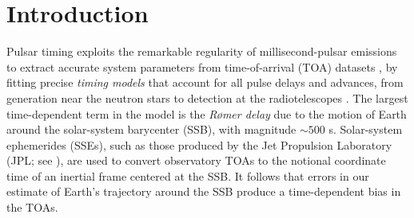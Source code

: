 \documentclass{aastex63}
\begin{document}


\section{Introduction}
\label{sec:intro}

Pulsar timing exploits the remarkable regularity of millisecond-pulsar emissions to extract accurate system parameters from time-of-arrival (TOA) datasets \citep{2012hpa..book.....L},
by fitting precise \emph{timing models} that account for all pulse delays and advances, from generation near the neutron stars to detection at the radiotelescopes \citep{2013CQGra..30v4001L}.
The largest time-dependent term in the model is the \emph{R{\o}mer delay} \citep{Roemer1676} due to the motion of Earth around the solar-system barycenter (SSB), with magnitude $\sim 500$ s. Solar-system ephemerides (SSEs), such as those produced by the Jet Propulsion Laboratory (JPL; see \citealt{2009IPNPR.178C...1F,2014IPNPR.196C...1F,de435,de436,de438}), are used to convert observatory TOAs to the notional coordinate time of an inertial frame centered at the SSB.
It follows that errors in our estimate of Earth's trajectory around the SSB produce a time-dependent bias in the TOAs.
\end{document}
